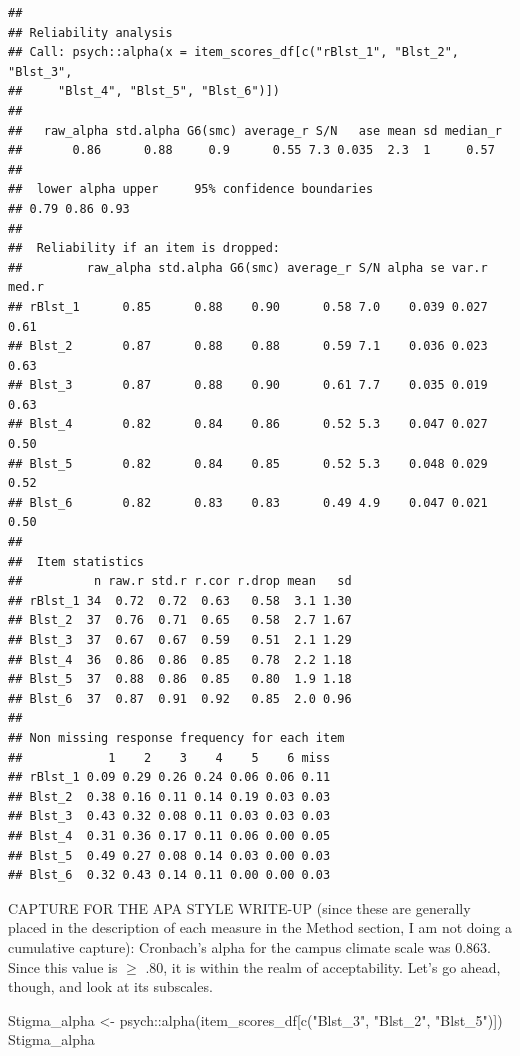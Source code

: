 \documentclass[
  english,
]{book}
\newenvironment{Shaded}{\begin{snugshade}}{\end{snugshade}}
\newcommand{\FunctionTok}[1]{\textcolor[rgb]{0.00,0.00,0.00}{#1}}
\newcommand{\NormalTok}[1]{#1}
\newcommand{\OtherTok}[1]{\textcolor[rgb]{0.56,0.35,0.01}{#1}}
\newcommand{\SpecialCharTok}[1]{\textcolor[rgb]{0.00,0.00,0.00}{#1}}
\newcommand{\StringTok}[1]{\textcolor[rgb]{0.31,0.60,0.02}{#1}}
\begin{document}
\begin{verbatim}
## 
## Reliability analysis   
## Call: psych::alpha(x = item_scores_df[c("rBlst_1", "Blst_2", "Blst_3", 
##     "Blst_4", "Blst_5", "Blst_6")])
## 
##   raw_alpha std.alpha G6(smc) average_r S/N   ase mean sd median_r
##       0.86      0.88     0.9      0.55 7.3 0.035  2.3  1     0.57
## 
##  lower alpha upper     95% confidence boundaries
## 0.79 0.86 0.93 
## 
##  Reliability if an item is dropped:
##         raw_alpha std.alpha G6(smc) average_r S/N alpha se var.r med.r
## rBlst_1      0.85      0.88    0.90      0.58 7.0    0.039 0.027  0.61
## Blst_2       0.87      0.88    0.88      0.59 7.1    0.036 0.023  0.63
## Blst_3       0.87      0.88    0.90      0.61 7.7    0.035 0.019  0.63
## Blst_4       0.82      0.84    0.86      0.52 5.3    0.047 0.027  0.50
## Blst_5       0.82      0.84    0.85      0.52 5.3    0.048 0.029  0.52
## Blst_6       0.82      0.83    0.83      0.49 4.9    0.047 0.021  0.50
## 
##  Item statistics 
##          n raw.r std.r r.cor r.drop mean   sd
## rBlst_1 34  0.72  0.72  0.63   0.58  3.1 1.30
## Blst_2  37  0.76  0.71  0.65   0.58  2.7 1.67
## Blst_3  37  0.67  0.67  0.59   0.51  2.1 1.29
## Blst_4  36  0.86  0.86  0.85   0.78  2.2 1.18
## Blst_5  37  0.88  0.86  0.85   0.80  1.9 1.18
## Blst_6  37  0.87  0.91  0.92   0.85  2.0 0.96
## 
## Non missing response frequency for each item
##            1    2    3    4    5    6 miss
## rBlst_1 0.09 0.29 0.26 0.24 0.06 0.06 0.11
## Blst_2  0.38 0.16 0.11 0.14 0.19 0.03 0.03
## Blst_3  0.43 0.32 0.08 0.11 0.03 0.03 0.03
## Blst_4  0.31 0.36 0.17 0.11 0.06 0.00 0.05
## Blst_5  0.49 0.27 0.08 0.14 0.03 0.00 0.03
## Blst_6  0.32 0.43 0.14 0.11 0.00 0.00 0.03
\end{verbatim}

CAPTURE FOR THE APA STYLE WRITE-UP (since these are generally placed in the description of each measure in the Method section, I am not doing a cumulative capture): Cronbach's alpha for the campus climate scale was 0.863. Since this value is \(\geq\) .80, it is within the realm of acceptability. Let's go ahead, though, and look at its subscales.

\begin{Shaded}
\begin{Highlighting}[]
\NormalTok{Stigma\_alpha }\OtherTok{\textless{}{-}}\NormalTok{ psych}\SpecialCharTok{::}\FunctionTok{alpha}\NormalTok{(item\_scores\_df[}\FunctionTok{c}\NormalTok{(}\StringTok{"Blst\_3"}\NormalTok{, }\StringTok{"Blst\_2"}\NormalTok{, }\StringTok{"Blst\_5"}\NormalTok{)])}
\NormalTok{Stigma\_alpha}
\end{Highlighting}
\end{Shaded}
\end{document}
